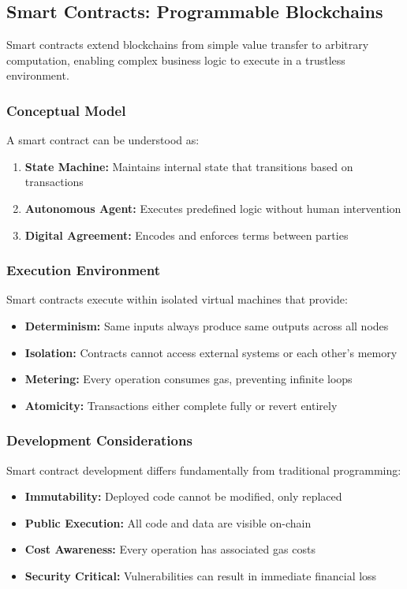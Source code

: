 \subsection{Smart Contracts: Programmable Blockchains}

Smart contracts extend blockchains from simple value transfer to arbitrary computation, enabling complex business logic to execute in a trustless environment.

\subsubsection{Conceptual Model}
A smart contract can be understood as:
\begin{enumerate}
    \item \textbf{State Machine:} Maintains internal state that transitions based on transactions
    \item \textbf{Autonomous Agent:} Executes predefined logic without human intervention
    \item \textbf{Digital Agreement:} Encodes and enforces terms between parties
\end{enumerate}

\subsubsection{Execution Environment}
Smart contracts execute within isolated virtual machines that provide:
\begin{itemize}
    \item \textbf{Determinism:} Same inputs always produce same outputs across all nodes
    \item \textbf{Isolation:} Contracts cannot access external systems or each other's memory
    \item \textbf{Metering:} Every operation consumes gas, preventing infinite loops
    \item \textbf{Atomicity:} Transactions either complete fully or revert entirely
\end{itemize}

\subsubsection{Development Considerations}
Smart contract development differs fundamentally from traditional programming:
\begin{itemize}
    \item \textbf{Immutability:} Deployed code cannot be modified, only replaced
    \item \textbf{Public Execution:} All code and data are visible on-chain
    \item \textbf{Cost Awareness:} Every operation has associated gas costs
    \item \textbf{Security Critical:} Vulnerabilities can result in immediate financial loss
\end{itemize}

